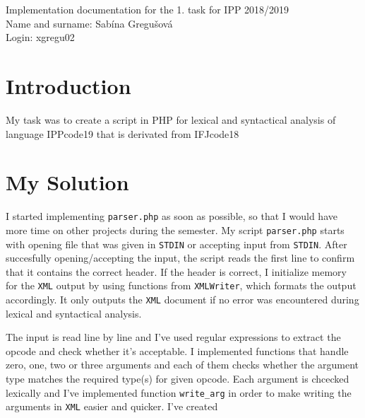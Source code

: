 \documentclass[10pt, a4paper]{article}
\begin{document}
\begin{center}
Implementation documentation for the 1. task for IPP 2018/2019\\
Name and surname: Sabína Gregušová\\
Login: xgregu02
\end{center}

\section*{Introduction}
My task was to create a script  in PHP for lexical and syntactical analysis of language IPPcode19 that is derivated from IFJcode18
\section*{My Solution}
I started implementing \texttt{parser.php} as soon as possible, so that I would have more time on other projects during the semester. My script \texttt{parser.php} starts with opening file that was given in \texttt{STDIN} or accepting input from \texttt{STDIN}. After succesfully opening/accepting the input, the script reads the first line to confirm that it contains the correct header. If the header is correct, I initialize memory for the \texttt{XML} output by using functions from \texttt{XMLWriter}, which formats the output accordingly. It only outputs the \texttt{XML} document if no error was encountered during lexical and syntactical analysis.

The input is read line by line and I've used regular expressions to extract the opcode and check whether it's acceptable. I implemented functions that handle zero, one, two or three arguments and each of them checks whether the argument type matches the required type(s) for given opcode. Each argument is chcecked lexically and I've implemented function \texttt{write\_arg} in order to make writing the arguments in \texttt{XML} easier and quicker. I've created
\end{document}

